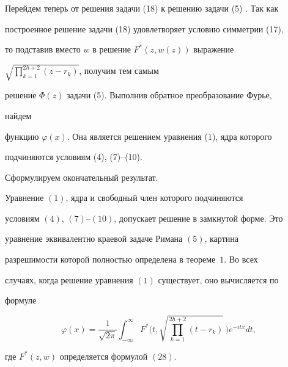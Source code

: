  


Перейдем теперь от решения задачи (18) к решению задачи (5) . Так как 


построенное решение задачи (18) удовлетворяет условию симметрии (17), 


то подставив вместо $w$ в решение $F^*(z,w(z))$ выражение 


$\sqrt{\prod\limits^{2h+2}_{k=1}(z-r_k)}$, получим тем самым 


решение $\Phi(z)$ задачи (5). Выполнив обратное преобразование Фурье, 


найдем 


функцию $\varphi(x)$. Она является решением уравнения (1), ядра которого 


подчиняются условиям (4), (7)--(10). 


 


Сформулируем окончательный результат. 


 


\begin{thm} 


Уравнение $(1)$, ядра и свободный член которого подчиняются 


условиям $(4)$, $(7)$--$(10)$, допускает решение в замкнутой форме. Это 


уравнение эквивалентно краевой задаче Римана $(5)$, картина 


разрешимости которой полностью определена в теореме~$1$. Во всех 


случаях, когда решение уравнения $(1)$ существует, оно вычисляется по 


формуле 


$$


\varphi(x)=\frac{1}{\sqrt{2\pi}} 


\int^\infty_{-\infty}F^*\bigg(t, 


\sqrt{\prod^{2h+2}_{k=1}(t-r_k)}\,\bigg) 


e^{-itx}dt, 


$$


где $F^*(z,w)$ определяется формулой $(28)$. 


\end{thm} 


 


